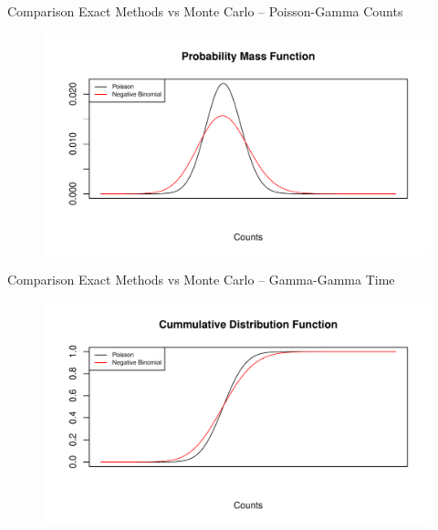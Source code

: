 \documentclass[english]{beamer}\usepackage[]{graphicx}\usepackage[]{xcolor}
\makeatletter
\def\maxwidth{ %
  \ifdim\Gin@nat@width>\linewidth
    \linewidth
  \else
    \Gin@nat@width
  \fi
}
\newenvironment{knitrout}{}{} %
\makeatother
\begin{document}
\begin{frame}{Comparison Exact Methods vs Monte Carlo -- Poisson-Gamma Counts}

\begin{figure}
\begin{knitrout}
\color{fgcolor}
\includegraphics[width=\maxwidth]{figures/figunnamed-chunk-14-1} 
\end{knitrout}
\end{figure}

\end{frame}


\begin{frame}{Comparison Exact Methods vs Monte Carlo -- Gamma-Gamma Time}
\begin{figure}
\begin{knitrout}
\color{fgcolor}
\includegraphics[width=\maxwidth]{figures/figunnamed-chunk-15-1} 
\end{knitrout}
\end{figure}
\end{frame}
\end{document}
